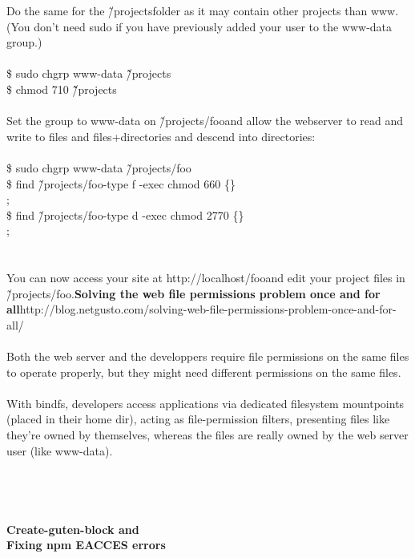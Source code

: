 \documentclass[10pt,a4paper]{article}
\begin{document}
{{{{{{{{{{{{{{{{{{{{Do the same for the \~/projects}{\large  folder as it may contain other projects than www.}{\large  \\
(You don't need sudo if you have previously added your user to the www-data group.)\\
\\
\$ sudo chgrp www-data \~ \~/projects}{\large \\
\$ chmod 710 \~ \~/projects}{\large \\
\\
Set the group to www-data on \~/projects/foo}{\large  and allow the webserver to read and write to files and files+directories and descend into directories:\\
\\
\$ sudo chgrp www-data \~/projects/foo}{\large \\
\$ find \~/projects/foo}{\large  -type f -exec chmod 660 \{\} \\;\\
\$ find \~/projects/foo}{\large  -type d -exec chmod 2770 \{\} \\;\\
\\
\\
You can now access your site at http://localhost/foo}{\large  and edit your project files in \~/projects/foo.}{\large }\textbf{{\Large Solving the web file permissions problem once and for all}}{\large }http://blog.netgusto.com/solving-web-file-permissions-problem-once-and-for-all/{\large \\
\\
Both the web server and the developpers require file permissions on the same files to operate properly, but they might need different permissions on the same files.\\
\\
With bindfs, developers access applications via dedicated filesystem mountpoints (placed in their home dir), acting as file-permission filters, presenting files like they're owned by themselves, whereas the files are really owned by the web server user (like www-data).\\
\\
\\
\\
\\
\textbf{{\Large Create-guten-block and\\
Fixing npm EACCES errors }}}{\large {\large \\
\\
\\
}}}}}}}}}}}}}}}}}}}}}
\end{document}
